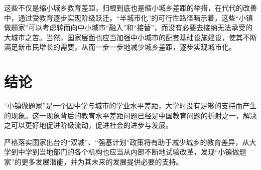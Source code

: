 \documentclass[10pt,a4paper,heading=false]{ctexart}
\begin{document}
    这些不仅是缩小城乡教育差距，归根到底也是缩小城乡差距的举措，在代代的改善中，通过受教育逐步实现阶级跃迁。“半城市化”的可行性路径暗示着，这些“小镇做题家”可以考虑转而向中小城市“融入”和“接替”，而没有必要去接纳无法承受的大城市之苦。当然，国家层面也应当加强中小城市的配套基础设施建设，使其不断满足新市民增长的需要，从而一步一步地减少城乡差距，逐步实现城市化。\cite{paracivil}

    \section{结论}
    “小镇做题家”是一个因中学与城市的学业水平差距，大学时没有足够的支持而产生的现象。这一现象背后的教育水平差距问题已经是中国教育问题的折射之一，解决之可以更好地促进阶级流动，促进社会的进步与发展。

    严格落实国家出台的“双减”、“强基计划”政策将有助于减少城乡的教育差异，从大学到中学到当地部门的各个机构也应当从内部不断地试验改革，发现“小镇做题家”的更多发展潜能，并为其未来的发展提供必要的支持。

    
\end{document}
